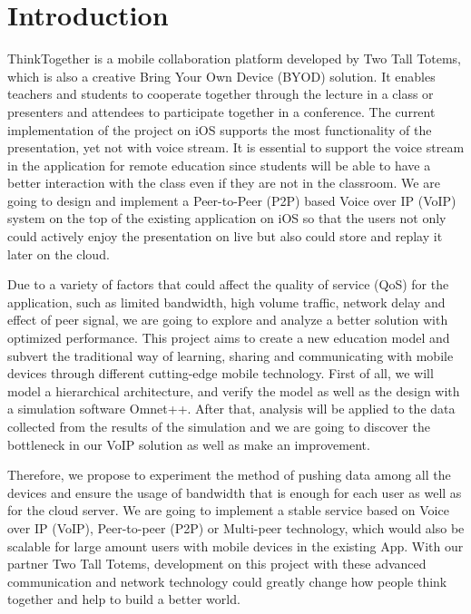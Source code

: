 \section{Introduction}

ThinkTogether is a mobile collaboration platform developed by Two Tall Totems, which is also a creative Bring Your Own Device (BYOD) solution. It enables teachers and students to cooperate together through the lecture in a class or presenters and attendees to participate together in a conference. The current implementation of the project on iOS supports the most functionality of the presentation, yet not with voice stream. It is essential to support the voice stream in the application for remote education since students will be able to have a better interaction with the class even if they are not in the classroom. We are going to design and implement a Peer-to-Peer (P2P) based Voice over IP (VoIP) system on the top of the existing application on iOS so that the users not only could actively enjoy the presentation on live but also could store and replay it later on the cloud.

Due to a variety of factors that could affect the quality of service (QoS) for the application, such as limited bandwidth, high volume traffic, network delay and effect of peer signal, we are going to explore and analyze a better solution with optimized performance. This project aims to create a new education model and subvert the traditional way of learning, sharing and communicating with mobile devices through different cutting-edge mobile technology. First of all, we will model a hierarchical architecture, and verify the model as well as the design with a simulation software Omnet++. After that, analysis will be applied to the data collected from the results of the simulation and we are going to discover the bottleneck in our VoIP solution as well as make an improvement.

Therefore, we propose to experiment the method of pushing data among all the devices and ensure the usage of bandwidth that is enough for each user as well as for the cloud server. We are going to implement a stable service based on Voice over IP (VoIP), Peer-to-peer (P2P) or Multi-peer technology, which would also be scalable for large amount users with mobile devices in the existing App. With our partner Two Tall Totems, development on this project with these advanced communication and network technology could greatly change how people think together and help to build a better world.

